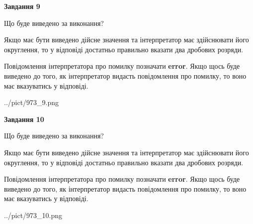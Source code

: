\documentclass[12pt, ukrainian]{article}
\begin{document}
{\begin {Large}
{\begin {center}\textbf{Завдання 9}\end {center}}\par
Що буде виведено за виконання? \par

Якщо має бути виведено дійсне значення та інтерпретатор має здійснювати його округлення, 
то у відповіді достатньо правильно вказати два дробових розряди.

Повідомлення інтерпретатора про помилку позначати \textbf{error}.
Якщо щось буде виведено до того, як інтерпретатор видасть повідомлення про помилку, 
то воно має вказуватись у відповіді. \par

\begin{center}
	{../pict/973_9.png}
\end{center}
\newpage

{\begin {center}\textbf{Завдання 10}\end {center}}\par
Що буде виведено за виконання? \par

Якщо має бути виведено дійсне значення та інтерпретатор має здійснювати його округлення, 
то у відповіді достатньо правильно вказати два дробових розряди.

Повідомлення інтерпретатора про помилку позначати \textbf{error}.
Якщо щось буде виведено до того, як інтерпретатор видасть повідомлення про помилку, 
то воно має вказуватись у відповіді. \par

\begin{center}
	{../pict/973_10.png}
\end{center}
\newpage

\end {Large}}
\end{document}
